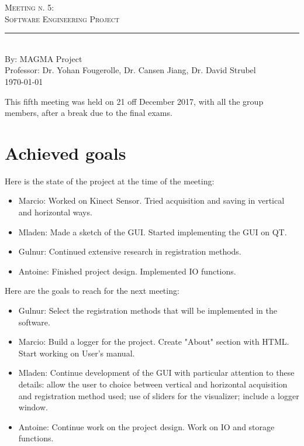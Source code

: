 \documentclass[aps,letterpaper,11pt]{revtex4}
\newcommand{\labno}{Meeting n. 5}
\newcommand{\labtitle}{Software Engineering Project}
\newcommand{\authorname}{MAGMA Project}
\newcommand{\professor}{Dr. Yohan Fougerolle, Dr. Cansen Jiang, Dr. David Strubel}
\begin{document}
  
\begin{titlepage}
\begin{center}
{\LARGE \textsc{\labno:} \\ \vspace{4pt}}
{\Large \textsc{\labtitle} \\ \vspace{4pt}} 
\rule[13pt]{\textwidth}{1pt} \\ \vspace{150pt}
{\large By: \authorname \\ \vspace{10pt}
Professor: \professor \\ \vspace{10pt}
\today}
\end{center}


\end{titlepage}%
\newpage
\tableofcontents
\newpage

This fifth meeting was held on 21 off December 2017, with all the group members, after a break due to the final exams.

\section{Achieved goals}

Here is the state of the project at the time of the meeting:

\begin{itemize}
\item Marcio: Worked on Kinect Sensor. Tried acquisition and saving in vertical and horizontal ways.
\item Mladen: Made a sketch of the GUI. Started implementing the GUI on QT.
\item Gulnur: Continued extensive research in registration methods.
\item Antoine: Finished project design. Implemented IO functions.
\end{itemize}

Here are the goals to reach for the next meeting:

\begin{itemize}
\item Gulnur: Select the registration methods that will be implemented in the software.
\item Marcio: Build a logger for the project. Create "About" section with HTML. Start working on User's manual.
\item Mladen: Continue development of the GUI with particular attention to these details: allow the user to choice between vertical and horizontal acquisition and registration method used; use of sliders for the visualizer; include a logger window.
\item Antoine: Continue work on the project design. Work on IO and storage functions.
\end{itemize}
\end{document}
